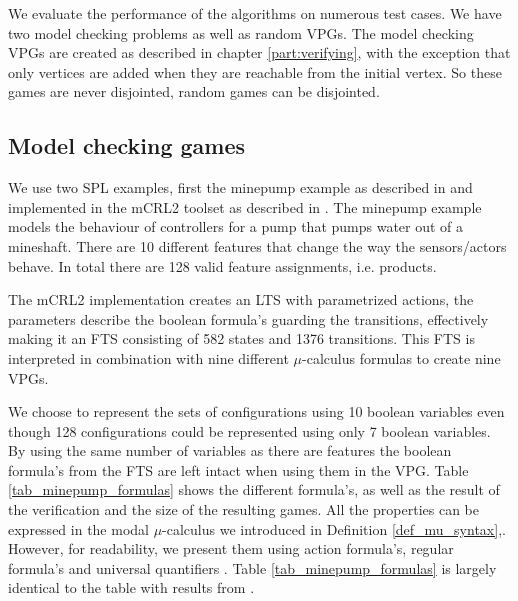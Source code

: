 We evaluate the performance of the algorithms on numerous test cases. We have two model checking problems as well as random VPGs. The model checking VPGs are created as described in chapter \ref{part:verifying}, with the exception that only vertices are added when they are reachable from the initial vertex. So these games are never disjointed, random games can be disjointed.

\subsection{Model checking games}
We use two SPL examples, first the minepump example as described in \cite{Kramer1983CONICAI} and implemented in the mCRL2 toolset as described in \cite{FamBasedModelCheckingWithMCRL2}. The minepump example models the behaviour of controllers for a pump that pumps water out of a mineshaft. There are 10 different features that change the way the sensors/actors behave. In total there are 128 valid feature assignments, i.e. products. 

The mCRL2 implementation creates an LTS with parametrized actions, the parameters describe the boolean formula's guarding the transitions, effectively making it an FTS consisting of 582 states and 1376 transitions. This FTS is interpreted in combination with nine different $\mu$-calculus formulas to create nine VPGs.

We choose to represent the sets of configurations using 10 boolean variables even though 128 configurations could be represented using only 7 boolean variables. By using the same number of variables as there are features the boolean formula's from the FTS are left intact when using them in the VPG. Table \ref{tab_minepump_formulas} shows the different formula's, as well as the result of the verification and the size of the resulting games. All the properties can be expressed in the modal $\mu$-calculus we introduced in Definition \ref{def_mu_syntax},. However, for readability, we present them using action formula's, regular formula's and universal quantifiers  \cite{Groote}. Table \ref{tab_minepump_formulas} is largely identical to the table with results from \cite{FamBasedModelCheckingWithMCRL2}.

